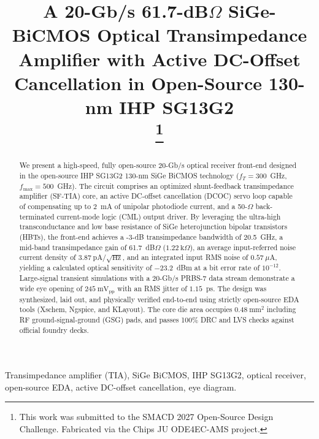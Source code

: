 \documentclass[conference]{IEEEtran}
\begin{document}
\title{A 20-Gb/s 61.7-dB$\Omega$ SiGe-BiCMOS Optical Transimpedance Amplifier with Active DC-Offset Cancellation in Open-Source 130-nm IHP SG13G2\\
\thanks{This work was submitted to the SMACD 2027 Open-Source Design Challenge. Fabricated via the Chips JU ODE4EC-AMS project.}
}

\author{
}

\maketitle

\begin{abstract}
We present a high-speed, fully open-source 20-Gb/s optical receiver front-end designed in the open-source IHP SG13G2 130-nm SiGe BiCMOS technology ($f_T = 300$~GHz, $f_{\max} = 500$~GHz). The circuit comprises an optimized shunt-feedback transimpedance amplifier (SF-TIA) core, an active DC-offset cancellation (DCOC) servo loop capable of compensating up to 2~mA of unipolar photodiode current, and a 50-$\Omega$ back-terminated current-mode logic (CML) output driver. By leveraging the ultra-high transconductance and low base resistance of SiGe heterojunction bipolar transistors (HBTs), the front-end achieves a -3-dB transimpedance bandwidth of 20.5~GHz, a mid-band transimpedance gain of 61.7~dB$\Omega$ ($1.22~\text{k}\Omega$), an average input-referred noise current density of $3.87~\text{pA}/\sqrt{\text{Hz}}$, and an integrated input RMS noise of $0.57~\mu\text{A}$, yielding a calculated optical sensitivity of $-23.2$~dBm at a bit error rate of $10^{-12}$. Large-signal transient simulations with a 20-Gb/s PRBS-7 data stream demonstrate a wide eye opening of $245~\text{mV}_{\text{pp}}$ with an RMS jitter of $1.15$~ps. The design was synthesized, laid out, and physically verified end-to-end using strictly open-source EDA tools (Xschem, Ngspice, and KLayout). The core die area occupies $0.48~\text{mm}^2$ including RF ground-signal-ground (GSG) pads, and passes 100\% DRC and LVS checks against official foundry decks.
\end{abstract}

\begin{IEEEkeywords}
Transimpedance amplifier (TIA), SiGe BiCMOS, IHP SG13G2, optical receiver, open-source EDA, active DC-offset cancellation, eye diagram.
\end{IEEEkeywords}
\end{document}
